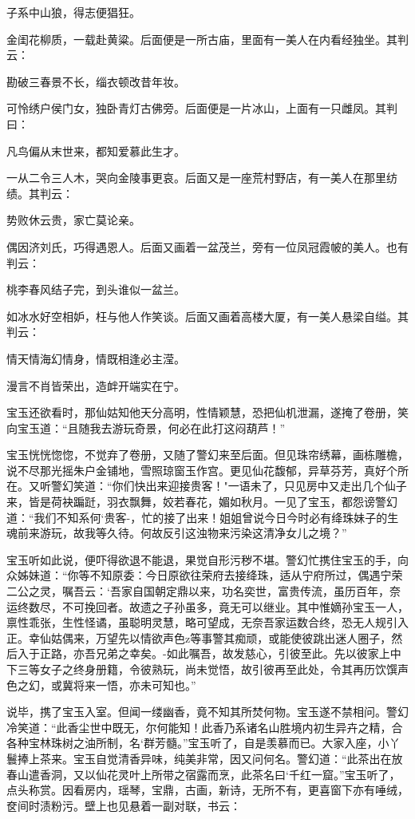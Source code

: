子系中山狼，得志便猖狂。

金闺花柳质，一载赴黄粱。后面便是一所古庙，里面有一美人在内看经独坐。其判云：

勘破三春景不长，缁衣顿改昔年妆。

可怜绣户侯门女，独卧青灯古佛旁。后面便是一片冰山，上面有一只雌凤。其判曰：

凡鸟偏从末世来，都知爱慕此生才。

一从二令三人木，哭向金陵事更哀。后面又是一座荒村野店，有一美人在那里纺绩。其判云：

势败休云贵，家亡莫论亲。

偶因济刘氏，巧得遇恩人。后面又画着一盆茂兰，旁有一位凤冠霞帔的美人。也有判云：

桃李春风结子完，到头谁似一盆兰。

如冰水好空相妒，枉与他人作笑谈。后面又画着高楼大厦，有一美人悬梁自缢。其判云：

情天情海幻情身，情既相逢必主滢。

漫言不肖皆荣出，造衅开端实在宁。

宝玉还欲看时，那仙姑知他天分高明，性情颖慧，恐把仙机泄漏，遂掩了卷册，笑向宝玉道：“且随我去游玩奇景，何必在此打这闷葫芦！”

宝玉恍恍惚惚，不觉弃了卷册，又随了警幻来至后面。但见珠帘绣幕，画栋雕檐，说不尽那光摇朱户金铺地，雪照琼窗玉作宫。更见仙花馥郁，异草芬芳，真好个所在。又听警幻笑道：“你们快出来迎接贵客！"一语未了，只见房中又走出几个仙子来，皆是荷袂蹁跹，羽衣飘舞，姣若春花，媚如秋月。一见了宝玉，都怨谤警幻道：“我们不知系何`贵客-，忙的接了出来！姐姐曾说今日今时必有绛珠妹子的生魂前来游玩，故我等久待。何故反引这浊物来污染这清净女儿之境？”

宝玉听如此说，便吓得欲退不能退，果觉自形污秽不堪。警幻忙携住宝玉的手，向众姊妹道：“你等不知原委：今日原欲往荣府去接绛珠，适从宁府所过，偶遇宁荣二公之灵，嘱吾云：`吾家自国朝定鼎以来，功名奕世，富贵传流，虽历百年，奈运终数尽，不可挽回者。故遗之子孙虽多，竟无可以继业。其中惟嫡孙宝玉一人，禀性乖张，生性怪谲，虽聪明灵慧，略可望成，无奈吾家运数合终，恐无人规引入正。幸仙姑偶来，万望先以情欲声色z等事警其痴顽，或能使彼跳出迷人圈子，然后入于正路，亦吾兄弟之幸矣。-如此嘱吾，故发慈心，引彼至此。先以彼家上中下三等女子之终身册籍，令彼熟玩，尚未觉悟，故引彼再至此处，令其再历饮馔声色之幻，或冀将来一悟，亦未可知也。”

说毕，携了宝玉入室。但闻一缕幽香，竟不知其所焚何物。宝玉遂不禁相问。警幻冷笑道：“此香尘世中既无，尔何能知！此香乃系诸名山胜境内初生异卉之精，合各种宝林珠树之油所制，名`群芳髓。”宝玉听了，自是羡慕而已。大家入座，小丫鬟捧上茶来。宝玉自觉清香异味，纯美非常，因又问何名。警幻道：“此茶出在放春山遣香洞，又以仙花灵叶上所带之宿露而烹，此茶名曰`千红一窟。”宝玉听了，点头称赏。因看房内，瑶琴，宝鼎，古画，新诗，无所不有，更喜窗下亦有唾绒，奁间时渍粉污。壁上也见悬着一副对联，书云：

